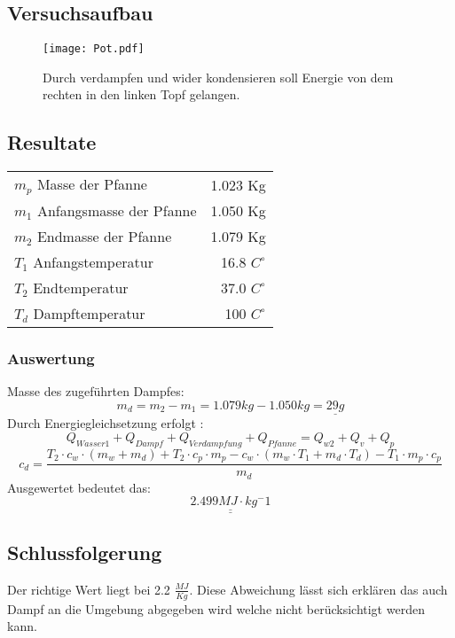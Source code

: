 \documentclass{article}
\begin{document}
\subsection{Versuchsaufbau}
\begin{figure}[H]
\texttt{[image: Pot.pdf]} 
\caption{Durch verdampfen und wider kondensieren soll Energie von dem rechten in den linken Topf gelangen.}
\end{figure}
\subsection{Resultate}

\begin{tabular}[H]{l r}
$m_p$ Masse der Pfanne & 1.023 Kg \\
$m_1$ Anfangsmasse der Pfanne & 1.050 Kg \\
$m_2$ Endmasse der Pfanne &  1.079 Kg \\
$T_1$ Anfangstemperatur & 16.8 $C^\circ$ \\
$T_2$ Endtemperatur & 37.0 $C^\circ$ \\
$T_d$ Dampftemperatur & 100 $C^\circ$ 

\end{tabular}

\subsubsection{Auswertung}
Masse des zugeführten Dampfes:
\begin{equation}
m_d = m_2 - m_1 = 1.079kg - 1.050 kg = \underline{29g}  
\end{equation}
Durch Energiegleichsetzung erfolgt :
\begin{equation}
Q_{Wasser1}+Q_{Dampf}+Q_{Verdampfung}+Q_{Pfanne} = Q_{w2}+Q_{v}+Q_{p}
\end{equation}
\begin{equation}
c_{d} = \frac{T_2 \cdot c_w \cdot(m_w+m_d)+T_2\cdot c_p \cdot m_p -c_w \cdot (m_{w}\cdot T_1 + m_d \cdot T_d)-T_1 \cdot m_p \cdot c_p}{m_d}
\end{equation}
Ausgewertet bedeutet das:
\begin{equation}
\underline{\underline{2.499 MJ \cdot kg^-1}}
\end{equation}

\subsection{Schlussfolgerung}
Der richtige Wert liegt bei 2.2 $\frac{MJ}{Kg}$. Diese Abweichung lässt sich erklären das auch Dampf an die Umgebung abgegeben wird welche nicht berücksichtigt werden kann.  
\end{document}
